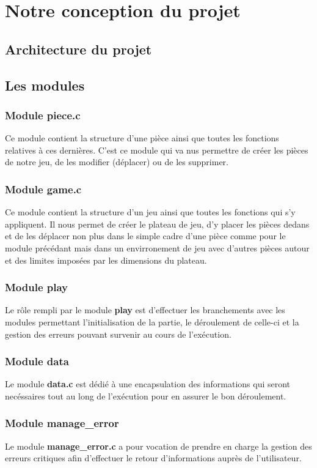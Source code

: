 \documentclass{report}
\begin{document}
\chapter{Notre conception du projet}
\setcounter{section}{0}
\section{Architecture du projet}

\section{Les modules}
\subsection*{Module piece.c}
Ce module contient la structure d'une pièce ainsi que toutes les fonctions relatives à ces dernières. C'est ce module qui va nus permettre de créer les pièces de notre jeu, de les modifier (déplacer) ou de les supprimer.
\subsection*{Module game.c}
Ce module contient la structure d'un jeu ainsi que toutes les fonctions qui s'y appliquent. Il nous permet de créer le plateau de jeu, d'y placer les pièces dedans et de les déplacer non plus dans le simple cadre d'une pièce comme pour le module précédant mais dans un envirronement de jeu avec d'autres pièces autour et des limites imposées par les dimensions du plateau.
\subsection*{Module play}
Le rôle rempli par le module \textbf{play} est d'effectuer les branchements avec les modules permettant l'initialisation de la partie, le déroulement de celle-ci et la gestion des erreurs pouvant survenir au cours de l'exécution.
\subsection*{Module data}
Le module \textbf{data.c} est dédié à une encapsulation des informations qui seront necéssaires tout au long de l'exécution pour en assurer le bon déroulement.
\subsection*{Module manage\_error}
Le module \textbf{manage\_error.c} a pour vocation de prendre en charge la gestion des erreurs critiques afin d'effectuer le retour d'informations auprès de l'utilisateur.
\end{document}
